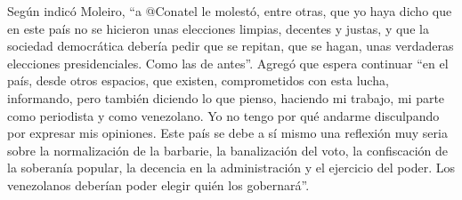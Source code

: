\documentclass{article}%
\begin{document}
%
Según indicó Moleiro, “a @Conatel le molestó, entre otras, que yo haya dicho que en este país no se hicieron unas elecciones limpias, decentes y justas, y que la sociedad democrática debería pedir que se repitan, que se hagan, unas verdaderas elecciones presidenciales. Como las de antes”.%
\newline%
%
Agregó que espera continuar “en el país, desde otros espacios, que existen, comprometidos con esta lucha, informando, pero también diciendo lo que pienso, haciendo mi trabajo, mi parte como periodista y como venezolano. Yo no tengo por qué andarme disculpando por expresar mis opiniones. Este país se debe a sí mismo una reflexión muy seria sobre la normalización de la barbarie, la banalización del voto, la confiscación de la soberanía popular, la decencia en la administración y el ejercicio del poder. Los venezolanos deberían poder elegir quién los gobernará”.%
\newline%
%
\end{document}
